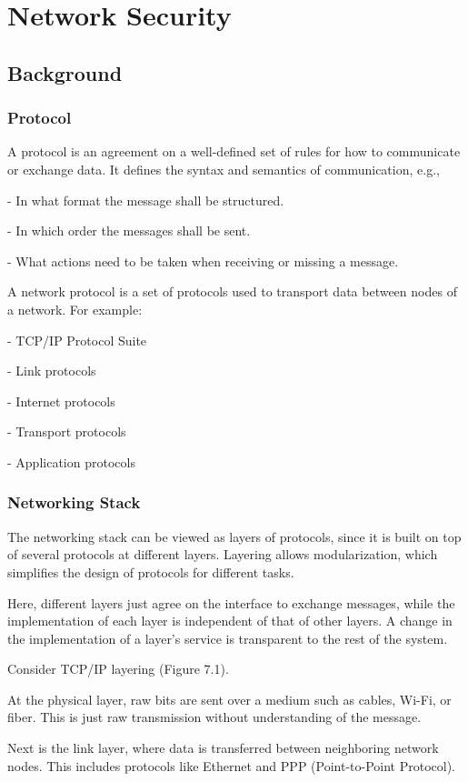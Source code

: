 \chapter{Network Security}

\section{Background}
\subsection{Protocol}
A protocol is an agreement on a well-defined set of rules for how to communicate or exchange data. It defines the syntax and semantics of communication, e.g., 

- In what format the message shall be structured.  

- In which order the messages shall be sent.  

- What actions need to be taken when receiving or missing a message.  

A network protocol is a set of protocols used to transport data between nodes of a network. For example:

- TCP/IP Protocol Suite  

- Link protocols  

- Internet protocols  

- Transport protocols  

- Application protocols  

\subsection{Networking Stack}
The networking stack can be viewed as layers of protocols, since it is built on top of several protocols at different layers. Layering allows modularization, which simplifies the design of protocols for different tasks. 

Here, different layers just agree on the interface to exchange messages, while the implementation of each layer is independent of that of other layers. A change in the implementation of a layer's service is transparent to the rest of the system. 

Consider TCP/IP layering (Figure 7.1). 

At the physical layer, raw bits are sent over a medium such as cables, Wi-Fi, or fiber. This is just raw transmission without understanding of the message.

Next is the link layer, where data is transferred between neighboring network nodes. This includes protocols like Ethernet and PPP (Point-to-Point Protocol).

